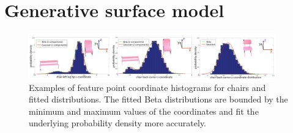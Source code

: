 \section{Generative surface model}
\label{sec:bsm}

\begin{figure}[t!]
\centering
\includegraphics[width=0.95\textwidth]{figures/figure_histograms.pdf}
\vskip -2mm
\caption{Examples of feature point coordinate histograms for chairs and fitted distributions. The fitted Beta distributions are bounded by the minimum and maximum values of the coordinates and fit the underlying probability density more accurately.}
\vskip -8mm
\label{fig:motivation}
\end{figure}


